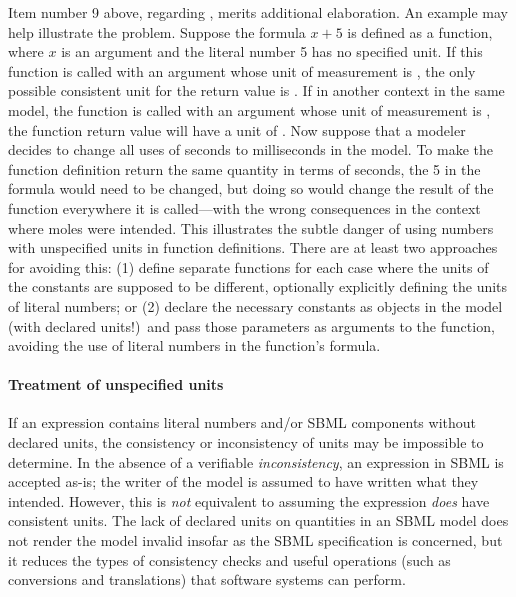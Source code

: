 Item number 9 above, regarding \FunctionDefinition, merits
additional elaboration.  An example may help illustrate the
problem.  Suppose the formula $x + 5$ is defined as a function,
where $x$ is an argument and the literal number 5 has no specified
unit.  If this function is called with an argument whose unit of
measurement is , the only possible consistent unit for
the return value is .  If in another context in the
same model, the function is called with an argument whose unit of
measurement is , the function return value will have
a unit of .  Now suppose that a modeler decides to
change all uses of seconds to milliseconds in the model.  To make
the function definition return the same quantity in terms of
seconds, the 5 in the formula would need to be changed, but doing
so would change the result of the function everywhere it is
called---with the wrong consequences in the context where moles
were intended.  This illustrates the subtle danger of using
numbers with unspecified units in function definitions.  There are
at least two approaches for avoiding this: (1) define separate
functions for each case where the units of the constants are
supposed to be different, optionally explicitly defining the units
of literal numbers; or (2) declare the necessary constants as
\Parameter objects in the model (with declared units!)\ and pass
those parameters as arguments to the function, avoiding the use of
literal numbers in the function's formula.


\paragraph{Treatment of unspecified units}

If an expression contains literal numbers and/or SBML components
without declared units, the consistency or inconsistency of units
may be impossible to determine.  In the absence of a verifiable
\emph{inconsistency}, an expression in SBML is accepted as-is; the
writer of the model is assumed to have written what they intended.
However, this is \emph{not} equivalent to assuming the expression
\emph{does} have consistent units.  The lack of declared units on
quantities in an SBML model does not render the model invalid
insofar as the SBML specification is concerned, but it reduces the
types of consistency checks and useful operations (such as
conversions and translations) that software systems can perform.

